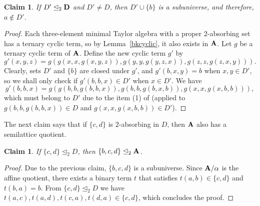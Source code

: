 \documentclass[11pt]{amsart}
\newcommand{\m}[1]{\mathbf{\uppercase{#1}}}
\theoremstyle{definition}
\theoremstyle{remark}
\theoremstyle{plain}
\newtheorem{claim}[thm]{Claim}
\begin{document}
\begin{claim}\label{D'bissubuniverse}
If $D'\trianglelefteq_2 \m d$ and $D'\neq D$, then $D'\cup\{b\}$ is a subuniverse, and therefore, $a\notin D'$.
\end{claim}
\begin{proof}
Each three-element minimal Taylor algebra with a proper 2-absorbing set has a ternary cyclic term, so by Lemma~\ref{bkcyclic}, it also exists in $\m a$. Let $g$ be a ternary cyclic term of $\m a$. Define the new cyclic term $g'$ by $$g'(x,y,z)=g(g(x,x,g(x,y,z)),g(y,y,g(y,z,x)),g(z,z,g(z,x,y))).$$ Clearly, sets $D'$ and $\{b\}$ are closed under $g'$, and $g'(b,x,y)=b$ when $x,y\in D'$, so we shall only check if $g'(b,b,x)\in D'$ when $x\in D'$. We have $$g'(b,b,x)=g(g(b,b,g(b,b,x)),g(b,b,g(b,x,b)),g(x,x,g(x,b,b))),$$ which must belong to $D'$ due to the item (1) of  (applied to $g(b,b,g(b,b,x))\in D$ and $g(x,x,g(x,b,b))\in D'$).
\end{proof}
The next claim says that if $\{c,d\}$ is 2-absorbing in $D$, then $\m a$ also has a semilattice quotient.
\begin{claim}
If $\{c,d\}\trianglelefteq_2 D$, then $\{b,c,d\}\trianglelefteq_2\m a$.
\end{claim}
\begin{proof}
Due to the previous claim, $\{b,c,d\}$ is a subuniverse. Since $\m a/\alpha$ is the affine quotient, there exists a binary term $t$ that satisfies $t(a,b)\in\{c,d\}$ and $t(b,a)=b$. From $\{c,d\}\trianglelefteq_2 D$ we have $t(a,c),t(a,d),t(c,a),t(d,a)\in\{c,d\}$, which concludes the proof.
\end{proof}
\end{document}
